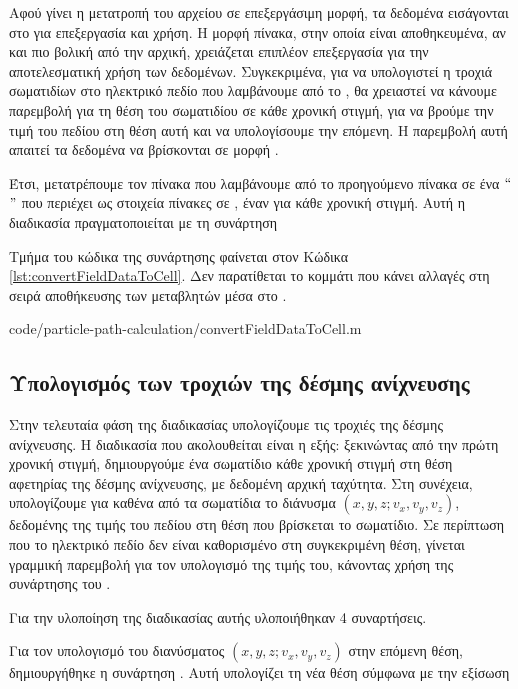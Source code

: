 Αφού γίνει η μετατροπή του αρχείου σε επεξεργάσιμη μορφή, τα δεδομένα εισάγονται στο  για επεξεργασία και χρήση.
Η μορφή πίνακα, στην οποία είναι αποθηκευμένα, αν και πιο βολική από την αρχική, χρειάζεται επιπλέον επεξεργασία για την αποτελεσματική χρήση των δεδομένων.
Συγκεκριμένα, για να υπολογιστεί η τροχιά σωματιδίων στο ηλεκτρικό πεδίο που λαμβάνουμε από το , θα χρειαστεί να κάνουμε παρεμβολή για τη θέση του σωματιδίου σε κάθε χρονική στιγμή, για να βρούμε την τιμή του πεδίου στη θέση αυτή και να υπολογίσουμε την επόμενη. 
Η παρεμβολή αυτή απαιτεί τα δεδομένα να βρίσκονται σε μορφή .

Έτσι, μετατρέπουμε τον πίνακα που λαμβάνουμε από το προηγούμενο πίνακα σε ένα $``$$"$ που περιέχει ως στοιχεία πίνακες σε , έναν για κάθε χρονική στιγμή. 
Αυτή η διαδικασία πραγματοποιείται με τη συνάρτηση 

Τμήμα του κώδικα της συνάρτησης φαίνεται στον Κώδικα \ref{lst:convertFieldDataToCell}. 
Δεν παρατίθεται το κομμάτι που κάνει αλλαγές στη σειρά αποθήκευσης των μεταβλητών μέσα στο .


{code/particle-path-calculation/convertFieldDataToCell.m}

\subsection{Υπολογισμός των τροχιών της δέσμης ανίχνευσης}

Στην τελευταία φάση της διαδικασίας υπολογίζουμε τις τροχιές της δέσμης ανίχνευσης.
Η διαδικασία που ακολουθείται είναι η εξής: ξεκινώντας από την πρώτη χρονική στιγμή, δημιουργούμε ένα σωματίδιο κάθε χρονική στιγμή στη θέση αφετηρίας της δέσμης ανίχνευσης, με δεδομένη αρχική ταχύτητα.
Στη συνέχεια, υπολογίζουμε για καθένα από τα σωματίδια το διάνυσμα $\left(x, y, z; v_x, v_y, v_z\right)$, δεδομένης της τιμής  του πεδίου στη θέση που βρίσκεται το σωματίδιο.
Σε περίπτωση που το ηλεκτρικό πεδίο δεν είναι καθορισμένο στη συγκεκριμένη θέση, γίνεται γραμμική παρεμβολή για τον υπολογισμό της τιμής του, κάνοντας χρήση της συνάρτησης του  .

Για την υλοποίηση της διαδικασίας αυτής υλοποιήθηκαν 4 συναρτήσεις.

Για τον υπολογισμό του διανύσματος $\left(x, y, z; v_x, v_y, v_z\right)$ στην επόμενη θέση, δημιουργήθηκε η συνάρτηση .
Αυτή υπολογίζει τη νέα θέση σύμφωνα με την εξίσωση 

